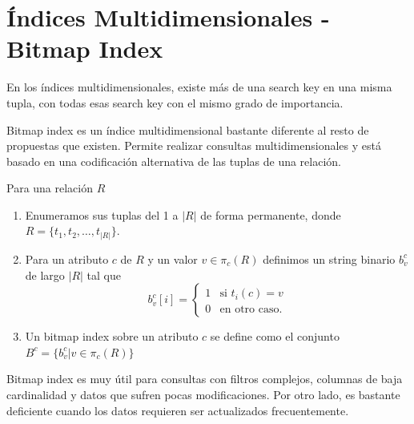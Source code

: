 \section{Índices Multidimensionales - Bitmap Index}
En los índices multidimensionales, existe más de una search key en una misma tupla, con todas esas search key con el mismo grado de importancia.

Bitmap index es un índice multidimensional bastante diferente al resto de propuestas que existen. Permite realizar consultas multidimensionales y está basado en una codificación alternativa de las tuplas de una relación.

Para una relación $R$
\begin{enumerate}
  \item Enumeramos sus tuplas del 1 a $|R|$ de forma permanente, donde $R = \{ t_1, t_2, \ldots, t_{|R|} \}$.
  \item Para un atributo $c$ de $R$ y un valor $v \in \pi_c(R)$ definimos un string binario $b_v^c$ de largo $|R|$ tal que
  \[ 
    b_v^c[i] = 
    \begin{cases} 
      1 & \text{si } t_i(c) = v\\
      0 & \text{en otro caso.}
    \end{cases}
  \]
  \item Un bitmap index sobre un atributo $c$ se define como el conjunto $B^c = \{ b_v^c | v \in \pi_c(R) \}$
\end{enumerate}

Bitmap index es muy útil para consultas con filtros complejos, columnas de baja cardinalidad y datos que sufren pocas modificaciones. Por otro lado, es bastante deficiente cuando los datos requieren ser actualizados frecuentemente.

